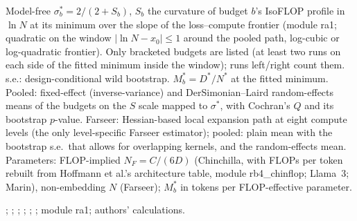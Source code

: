 \begin{table}[tp]
\begin{tablenotes}
Model-free $\sigma^*_b=2/(2+S_b)$, $S_b$ the curvature of budget $b$'s IsoFLOP profile in $\ln N$ at its minimum over the slope of the loss--compute frontier (module ra1; quadratic on the window $|\ln N-x_0|\le1$ around the pooled path, log-cubic or log-quadratic frontier). Only bracketed budgets are listed (at least two runs on each side of the fitted minimum inside the window); runs left/right count them. s.e.: design-conditional wild bootstrap. $M^*_b=D^*/N^*$ at the fitted minimum. Pooled: fixed-effect (inverse-variance) and DerSimonian--Laird random-effects means of the budgets on the $S$ scale mapped to $\sigma^*$, with Cochran's $Q$ and its bootstrap $p$-value. Farseer: Hessian-based local expansion path at eight compute levels (the only level-specific Farseer estimator); pooled: plain mean with the bootstrap s.e.\ that allows for overlapping kernels, and the random-effects mean. Parameters: FLOP-implied $N_F=C/(6D)$ (Chinchilla, with FLOPs per token rebuilt from Hoffmann et al.'s architecture table, module rb4\_chinflop; Llama~3; Marin), non-embedding $N$ (Farseer); $M^*_b$ in tokens per FLOP-effective parameter.
\end{tablenotes}

\begin{tablenotes}[Source]
\citet{hoffmann2022training}; \citet{besiroglu2024chinchilla}; \citet{grattafiori2024llama}; \citet{czech2026llama3isoflop}; \citet{marin2026ladders}; \citet{li2025predictableb}; module ra1; authors' calculations.
\end{tablenotes}
\end{table}
